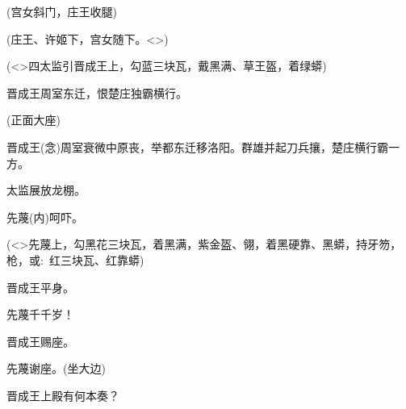 {(宫女{\hwfs 斜门}，庄王{\hwfs 收腿})


(庄王、许姬{\hwfs 下}，宫女{\hwfs 随下}。\textless{}\!\textgreater{})

\vspace{5pt}

(\textless{}\!\textgreater{}{\hwfs 四}太监{\hwfs 引}晋成王{\hwfs 上}，{\hwfs 勾}蓝三块瓦，{\hwfs 戴}黑满、草王盔，{\hwfs 着}绿蟒)

晋成王\hspace{20pt}{[}{\akai 引}{]}周室东迁，恨楚庄独霸横行。

({\hwfs 正面大座})

晋成王\hspace{20pt}({\akai 念})周室衰微中原丧，举都东迁移洛阳。群雄并起刀兵攘，楚庄横行霸一方。


太监\hspace{30pt}展放龙棚。

先蔑\hspace{30pt}({\akai 内})呵吓。

(\textless{}\!\textgreater{}先蔑{\hwfs 上}，{\hwfs 勾}黑花三块瓦，{\hwfs 着}黑满，紫金盔、翎，{\hwfs 着}黑硬靠、黑蟒，{\hwfs 持}牙笏，枪，{\akai 或}:~红三块瓦、红靠蟒)


晋成王\hspace{20pt}平身。

先蔑\hspace{30pt}千千岁！

晋成王\hspace{20pt}赐座。

先蔑\hspace{30pt}谢座。({\hwfs 坐大边})

晋成王\hspace{20pt}上殿有何本奏？

}
